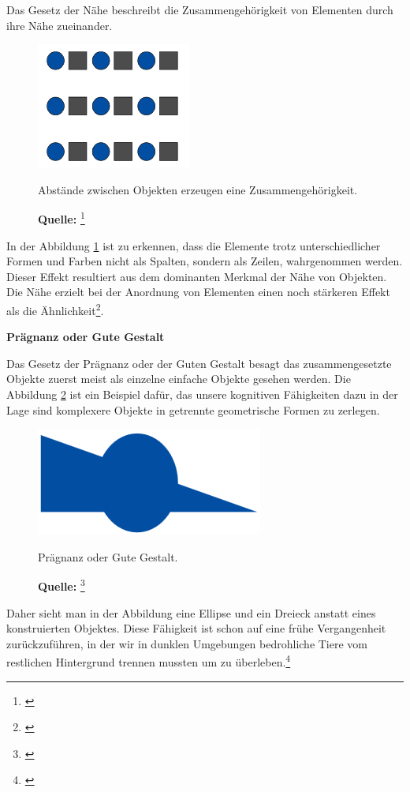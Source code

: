 Das Gesetz der Nähe beschreibt die Zusammengehörigkeit von Elementen durch ihre Nähe zueinander.
\begin{figure}[H]
  \centering
  \includegraphics[scale=1]{img/gesetz_der_Naehe.PNG}
  \caption{Abstände zwischen Objekten erzeugen eine Zusammengehörigkeit.}
    \caption*{\textbf{Quelle:} \footnote{\cite{Dahm2006}}}
  \label{fig:naehe}
\end{figure}
In der Abbildung \ref{fig:naehe} ist zu erkennen, dass die Elemente trotz unterschiedlicher Formen und Farben  nicht als Spalten, sondern als Zeilen, wahrgenommen werden. Dieser Effekt resultiert aus dem dominanten Merkmal der Nähe von Objekten. Die Nähe erzielt bei der Anordnung von Elementen einen noch stärkeren Effekt als die Ähnlichkeit\footnote{\cite[vgl.][60]{Dahm2006}}.

\textbf{Prägnanz oder Gute Gestalt}

Das Gesetz der Prägnanz oder der Guten Gestalt besagt das zusammengesetzte Objekte zuerst meist als einzelne einfache Objekte gesehen werden. Die Abbildung \ref{fig:praegnanzOderGuteGestalt} ist ein Beispiel dafür, das unsere kognitiven Fähigkeiten dazu in der Lage sind komplexere Objekte in getrennte geometrische Formen zu zerlegen.
\begin{figure}[H]
  \centering
  \includegraphics[scale=1]{img/gesetz_der_Praegnanz_oder_der_Guten_Gestalt.PNG}
  \caption{Prägnanz oder Gute Gestalt.}
    \caption*{\textbf{Quelle:} \footnote{\cite{Dahm2006}}}
  \label{fig:praegnanzOderGuteGestalt}
\end{figure}
 Daher sieht man in der Abbildung eine Ellipse und ein Dreieck anstatt eines konstruierten Objektes. Diese Fähigkeit ist schon auf eine frühe Vergangenheit zurückzuführen, in der wir in dunklen Umgebungen bedrohliche Tiere vom restlichen Hintergrund trennen mussten um zu überleben.\footnote{\cite[vgl.][61]{Dahm2006}}

